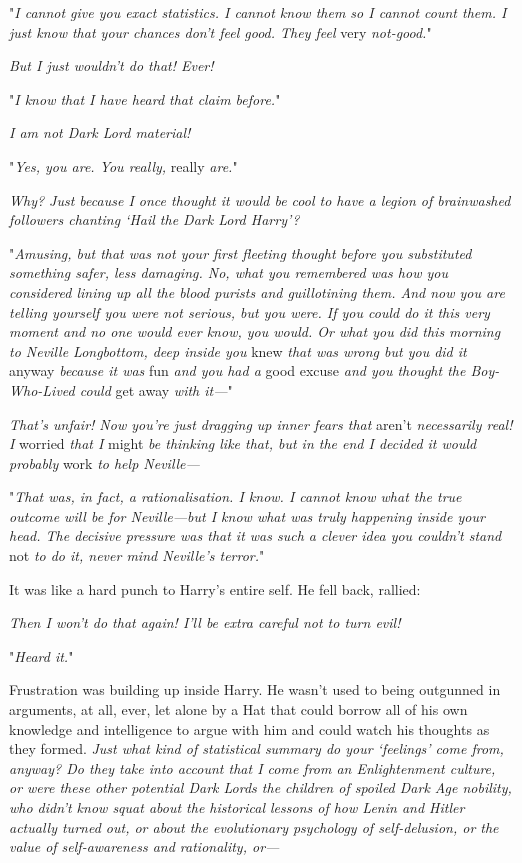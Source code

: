 "\emph{I cannot give you exact statistics. I cannot know them so I cannot count
them. I just know that your chances don't feel good. They feel} very \emph{not-good.}"

\emph{But I just wouldn't do that! Ever!}

"\emph{I know that I have heard that claim before.}"

\emph{I am not Dark Lord material!}

"\emph{Yes, you are. You really,} really \emph{are.}"

\emph{Why? Just because I once thought it would be cool to have a legion of
brainwashed followers chanting `Hail the Dark Lord Harry'?}

"\emph{Amusing, but that was not your first fleeting thought before you
substituted something safer, less damaging. No, what you remembered was how you
considered lining up all the blood purists and guillotining them. And now you
are telling yourself you were not serious, but you were. If you could do it
this very moment and no one would ever know, you would. Or what you did this
morning to Neville Longbottom, deep inside you} knew \emph{that was wrong but
you did it} anyway \emph{because it was} fun \emph{and you had a} good
excuse \emph{and you thought the Boy-Who-Lived could} get away \emph{with
it---}"

\emph{That's unfair! Now you're just dragging up inner fears that} aren't
\emph{necessarily real! I} worried \emph{that I} might \emph{be thinking like that,
but in the end I decided it would probably} work \emph{to help Neville---}

"\emph{That was, in fact, a rationalisation. I know. I cannot know what the
true outcome will be for Neville---but I know what was truly happening inside
your head. The decisive pressure was that it was such a clever idea you
couldn't stand} not \emph{to do it, never mind Neville's terror.}"

It was like a hard punch to Harry's entire self. He fell back, rallied:

\emph{Then I won't do that again! I'll be extra careful not to turn evil!}

"\emph{Heard it.}"

Frustration was building up inside Harry. He wasn't used to being outgunned in
arguments, at all, ever, let alone by a Hat that could borrow all of his own
knowledge and intelligence to argue with him and could watch his thoughts as
they formed. \emph{Just what kind of statistical summary do your `feelings'
come from, anyway? Do they take into account that I come from an Enlightenment
culture, or were these other potential Dark Lords the children of spoiled Dark
Age nobility, who didn't know squat about the historical lessons of how Lenin
and Hitler actually turned out, or about the evolutionary psychology of
self-delusion, or the value of self-awareness and rationality, or---}

